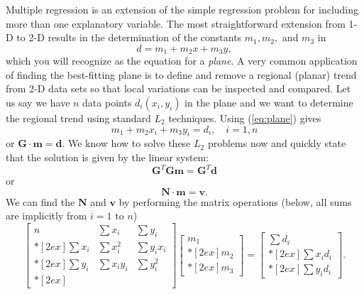 	Multiple regression is an extension of the simple regression problem for including more than 
one explanatory variable.  The most straightforward extension from 1-D to 2-D results in the 
determination of the constants $m_1, m_2,$ and $m_3$ in
\begin{equation}
d = m_1 + m_2 x + m_3 y,
\label{eq:plane}
\end{equation}
which you will recognize as the equation for a \emph{plane}.  A very common application of finding the 
best-fitting plane is to define and remove a regional (planar) trend from 2-D data sets so that 
local variations can be inspected and compared.  Let us say we have $n$ data points $d_i(x_i, y_i)$ in the 
plane and we want to determine the regional trend using standard $L_2$ techniques.  Using (\ref{eq:plane}) 
gives
\begin{equation}
m_1 + m_2 x_i + m_3 y_i = d_i,\quad i = 1,n
\end{equation}
or $\mathbf{G\cdot m=d}$.  We know how to solve these $L_2$ problems now and quickly state that the solution is 
given by the linear system:
\begin{equation}
\mathbf{G}^T \mathbf{Gm = G}^T \mathbf{d}
\end{equation}
or 
\begin{equation}
\mathbf{	N\cdot m = v}.
\end{equation}
We can find the $\mathbf{N}$ and $\mathbf{v}$ by performing the matrix operations (below, all sums are implicitly from $i = 1$ to $n$)
\begin{equation}
\left [ \begin{array}{ccc}
n & \displaystyle \sum x_i & \displaystyle \sum y_i \\*[2ex]
\displaystyle \sum x_i & \displaystyle \sum x^2_i & \displaystyle \sum y_i x_i \\*[2ex]
\displaystyle \sum y_i & \displaystyle \sum x_i y_i & \displaystyle \sum y^2_i \\*[2ex]
\end{array} \right ]
\left[ \begin{array}{c}
m_1 \\*[2ex]
m_2 \\*[2ex]
m_3 
\end{array} \right]  = 
\left[ \begin{array}{c}
\displaystyle \sum d_i \\*[2ex] \displaystyle \sum x_i d_i\\*[2ex] 
\displaystyle \sum y_i d_i
\end{array} \right ].
\end{equation}	 
